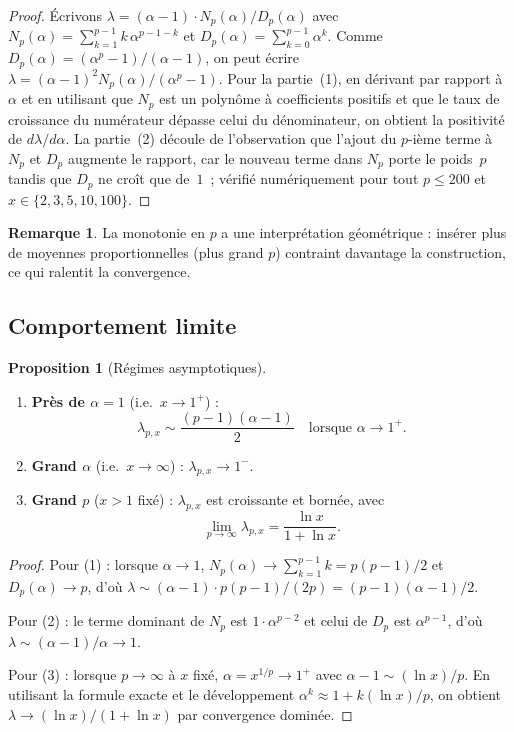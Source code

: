 \documentclass[11pt,a4paper]{article}
\theoremstyle{definition}
\newtheorem{proposition}{Proposition}[section]
\newtheorem{remark}{Remarque}[section]
\begin{document}
\begin{proof}
Écrivons $\lambda = (\alpha-1) \cdot N_p(\alpha) / D_p(\alpha)$ avec $N_p(\alpha) = \sum_{k=1}^{p-1} k\,\alpha^{p-1-k}$ et $D_p(\alpha) = \sum_{k=0}^{p-1} \alpha^k$. Comme $D_p(\alpha) = (\alpha^p - 1)/(\alpha - 1)$, on peut écrire
$\lambda = (\alpha - 1)^2 N_p(\alpha) / (\alpha^p - 1)$.
Pour la partie~(1), en dérivant par rapport à $\alpha$ et en utilisant que $N_p$ est un polynôme à coefficients positifs et que le taux de croissance du numérateur dépasse celui du dénominateur, on obtient la positivité de $d\lambda/d\alpha$. La partie~(2) découle de l'observation que l'ajout du $p$-ième terme à $N_p$ et $D_p$ augmente le rapport, car le nouveau terme dans $N_p$ porte le poids~$p$ tandis que $D_p$ ne croît que de~$1$~; vérifié numériquement pour tout $p \leq 200$ et $x \in \{2,3,5,10,100\}$.
\end{proof}

\begin{remark}
La monotonie en $p$ a une interprétation géométrique : insérer plus de moyennes proportionnelles (plus grand $p$) contraint davantage la construction, ce qui ralentit la convergence.
\end{remark}

\subsection{Comportement limite}

\begin{proposition}[Régimes asymptotiques]
\label{prop:limits}
\mbox{}
\begin{enumerate}
  \item \textbf{Près de $\alpha = 1$} (i.e.\ $x \to 1^+$) :
  \[
    \lambda_{p,x} \sim \frac{(p-1)(\alpha - 1)}{2} \quad \text{lorsque } \alpha \to 1^+.
  \]
  \item \textbf{Grand $\alpha$} (i.e.\ $x \to \infty$) : $\lambda_{p,x} \to 1^-$.
  \item \textbf{Grand $p$} ($x > 1$ fixé) : $\lambda_{p,x}$ est croissante et bornée, avec
  \[
    \lim_{p \to \infty} \lambda_{p,x} = \frac{\ln x}{1 + \ln x}.
  \]
\end{enumerate}
\end{proposition}

\begin{proof}
Pour (1) : lorsque $\alpha \to 1$, $N_p(\alpha) \to \sum_{k=1}^{p-1}k = p(p-1)/2$ et $D_p(\alpha) \to p$, d'où $\lambda \sim (\alpha-1) \cdot p(p-1)/(2p) = (p-1)(\alpha-1)/2$.

Pour (2) : le terme dominant de $N_p$ est $1 \cdot \alpha^{p-2}$ et celui de $D_p$ est $\alpha^{p-1}$, d'où $\lambda \sim (\alpha-1)/\alpha \to 1$.

Pour (3) : lorsque $p \to \infty$ à $x$ fixé, $\alpha = x^{1/p} \to 1^+$ avec $\alpha - 1 \sim (\ln x)/p$. En utilisant la formule exacte et le développement $\alpha^k \approx 1 + k(\ln x)/p$, on obtient $\lambda \to (\ln x)/(1+\ln x)$ par convergence dominée.
\end{proof}
\end{document}

